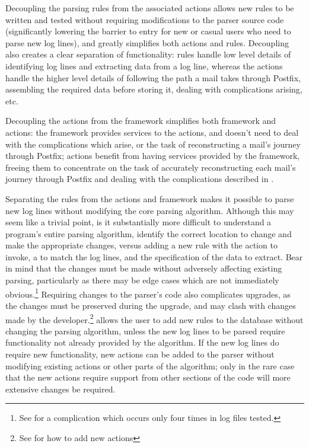 Decoupling the parsing rules from the associated actions allows new rules
to be written and tested without requiring modifications to the parser
source code (significantly lowering the barrier to entry for new or casual
users who need to parse new log lines), and greatly simplifies both actions
and rules.  Decoupling also creates a clear separation of functionality:
rules handle low level details of identifying log lines and extracting data
from a log line, whereas the actions handle the higher level details of
following the path a mail takes through Postfix, assembling the required
data before storing it, dealing with complications arising, etc.

Decoupling the actions from the framework simplifies both framework and
actions: the framework provides services to the actions, and doesn't need
to deal with the complications which arise, or the task of reconstructing a
mail's journey through Postfix; actions benefit from having services
provided by the framework, freeing them to concentrate on the task of
accurately reconstructing each mail's journey through Postfix and dealing
with the complications described in .

Separating the rules from the actions and framework makes it possible to
parse new log lines without modifying the core parsing algorithm.  Although
this may seem like a trivial point, is it substantially more difficult to
understand a program's entire parsing algorithm, identify the correct
location to change and make the appropriate changes, versus adding a new
rule with the action to invoke, a \regex{} to match the log lines, and the
specification of the data to extract.  Bear in mind that the changes must
be made without adversely affecting existing parsing, particularly as there
may be edge cases which are not immediately obvious.\footnote{See
 for a complication which
occurs only four times in \numberOFlogFILES{} log files tested.}  Requiring
changes to the parser's code also complicates upgrades, as the changes
must be preserved during the upgrade, and may clash with changes made by
the developer.\footnote{See  for how to add
new actions}  \parsername{} allows the user to add new rules to the
database without changing the parsing algorithm, unless the new log lines
to be parsed require functionality not already provided by the algorithm.
If the new log lines do require new functionality, new actions can be added
to the parser without modifying existing actions or other parts of the
algorithm; only in the rare case that the new actions require support from
other sections of the code will more extensive changes be required.


